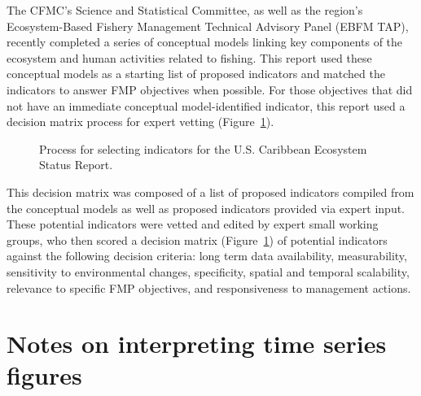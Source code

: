 \documentclass[
  letterpaper,
  oneside,
  open=any]{scrbook}
\begin{document}
The CFMC's Science and Statistical Committee, as well as the region's
Ecosystem-Based Fishery Management Technical Advisory Panel (EBFM TAP),
recently completed a series of conceptual models linking key components
of the ecosystem and human activities related to fishing. This report
used these conceptual models as a starting list of proposed indicators
and matched the indicators to answer FMP objectives when possible. For
those objectives that did not have an immediate conceptual
model-identified indicator, this report used a decision matrix process
for expert vetting (Figure~\ref{fig-flowchart}).

\begin{figure}


\caption{\label{fig-flowchart}Process for selecting indicators for the
U.S. Caribbean Ecosystem Status Report.}

\end{figure}%

This decision matrix was composed of a list of proposed indicators
compiled from the conceptual models as well as proposed indicators
provided via expert input. These potential indicators were vetted and
edited by expert small working groups, who then scored a decision matrix
(Figure~\ref{fig-flowchart}) of potential indicators against the
following decision criteria: long term data availability, measurability,
sensitivity to environmental changes, specificity, spatial and temporal
scalability, relevance to specific FMP objectives, and responsiveness to
management actions.

\section{Notes on interpreting time series
figures}\label{notes-on-interpreting-time-series-figures}
\end{document}
